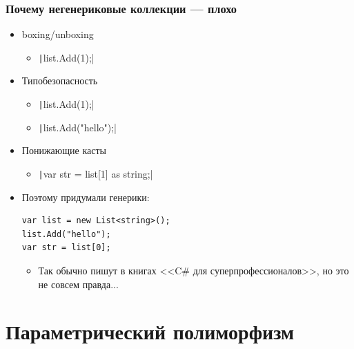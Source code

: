 \documentclass[xetex,mathserif,serif]{beamer}
\begin{document}
	\begin{frame}[fragile]
		\frametitle{Почему негенериковые коллекции --- плохо}
		\begin{itemize}
			\item boxing/unboxing
			\begin{itemize}
				\item \texttt|list.Add(1);|
			\end{itemize}
			\item Типобезопасность
			\begin{itemize}
				\item \texttt|list.Add(1);|
				\item \texttt|list.Add("hello");|
			\end{itemize}
			\item Понижающие касты
			\begin{itemize}
				\item \texttt|var str = list[1] as string;|
			\end{itemize}
			\item Поэтому придумали генерики:
			\begin{verbatim}
var list = new List<string>();
list.Add("hello");
var str = list[0];
			\end{verbatim}
			\begin{itemize}
				\item Так обычно пишут в книгах <<C\# для суперпрофессионалов>>, но это не совсем правда...
			\end{itemize}
		\end{itemize}
	\end{frame}

	\section{Параметрический полиморфизм}
\end{document}
